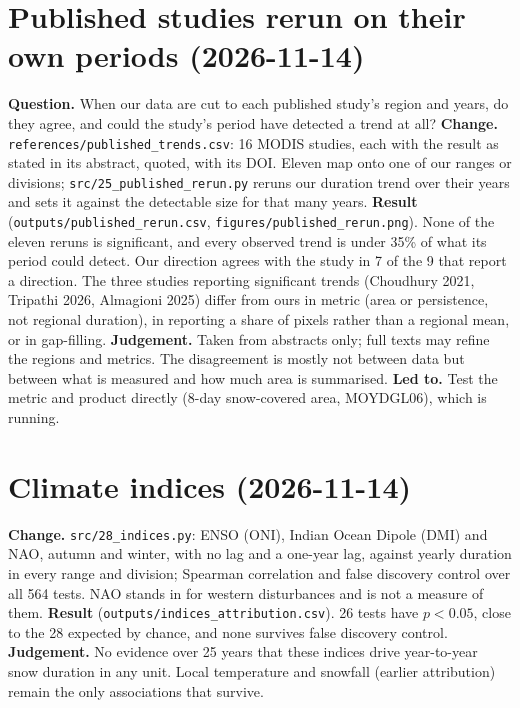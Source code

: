 \documentclass[11pt,a4paper]{article}
\begin{document}
\section{Published studies rerun on their own periods (2026-11-14)}
\textbf{Question.} When our data are cut to each published study's region and years, do they agree, and could the
study's period have detected a trend at all?
\textbf{Change.} \texttt{references/published\_trends.csv}: 16 MODIS studies, each with the result as stated in its
abstract, quoted, with its DOI. Eleven map onto one of our ranges or divisions; \texttt{src/25\_published\_rerun.py}
reruns our duration trend over their years and sets it against the detectable size for that many years.
\textbf{Result} (\texttt{outputs/published\_rerun.csv}, \texttt{figures/published\_rerun.png}). None of the eleven reruns is
significant, and every observed trend is under 35\% of what its period could detect. Our direction agrees with the
study in 7 of the 9 that report a direction. The three studies reporting significant trends (Choudhury 2021, Tripathi
2026, Almagioni 2025) differ from ours in metric (area or persistence, not regional duration), in reporting a share of
pixels rather than a regional mean, or in gap-filling.
\textbf{Judgement.} Taken from abstracts only; full texts may refine the regions and metrics. The disagreement is
mostly not between data but between what is measured and how much area is summarised.
\textbf{Led to.} Test the metric and product directly (8-day snow-covered area, MOYDGL06), which is running.

\section{Climate indices (2026-11-14)}
\textbf{Change.} \texttt{src/28\_indices.py}: ENSO (ONI), Indian Ocean Dipole (DMI) and NAO, autumn and winter, with no
lag and a one-year lag, against yearly duration in every range and division; Spearman correlation and false discovery
control over all 564 tests. NAO stands in for western disturbances and is not a measure of them.
\textbf{Result} (\texttt{outputs/indices\_attribution.csv}). 26 tests have $p<0.05$, close to the 28 expected by chance,
and none survives false discovery control.
\textbf{Judgement.} No evidence over 25 years that these indices drive year-to-year snow duration in any unit. Local
temperature and snowfall (earlier attribution) remain the only associations that survive.
\end{document}
